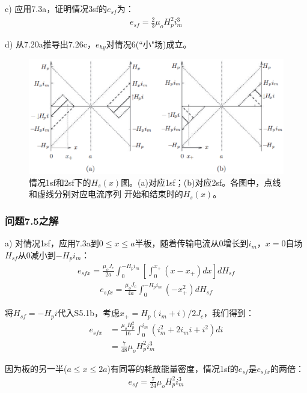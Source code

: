 c) 应用7.3a，证明情况3sf的$e_{sf}$为：
\begin{align*}%
e_{sf}=\frac{2}{3}\mu_oH_{p}^{2}i_{m}^{3} \tag{7.26c}
\end{align*}

d) 从7.20a推导出7.26c，$e_{hy}$对情况6(``小"场)成立。
\begin{figure}[htbp]
	\centering
	\includegraphics[scale=0.6]{chpt7/figs/fig7.17.eps}
	\caption{情况1sf和2sf下的$H_s(x)$图。(a)对应1sf；(b)对应2sf。各图中，点线和虚线分别对应电流序列
		开始和结束时的$H_s(x)$。}
\end{figure}


\subsubsection{问题7.5之解}
a) 对情况1sf，应用7.3a到$0\le x\le a$半板，随着传输电流从0增长到$i_m$，$x=0$自场$H_{sf}$从0减小到$-H_p i_m$：
\begin{align*}%
e_{sfx}=\frac{\mu_oJ_c}{2a}\int_{0}^{-H_pi_m}\left[\int_{0}^{x_+}(x-x_+)dx\right]dH_{sf}  \tag{S5.1a}
\end{align*}
\begin{align*}
e_{sfx}=\frac{\mu_oJ_c}{4a}\int_{0}^{-H_pi_m}(-x_{+}^{2})dH_{sf} \tag{S5.1b}
\end{align*}

将$H_{sf}=-H_p i$代入S5.1b，考虑$x_+=H_p(i_m+i)/2J_c$，我们得到：
\begin{align*}%
e_{sfx}&=\frac{\mu_oH_{p}^{2}}{16}\int_{0}^{i_m}(i_{m}^{2}+2i_mi+i^2)di \\
&=\frac{7}{48}\mu_oH_{p}^{2}i_{m}^{3} \tag{S5.2}
\end{align*}

因为板的另一半($a\le x\le 2a$)有同等的耗散能量密度，情况1sf的$e_{sf}$是$e_{sfx}$的两倍：
\begin{align*}%
e_{sf}=\frac{7}{24}\mu_oH_{p}^{2}i_{m}^{3} \tag{7.26a}
\end{align*}

